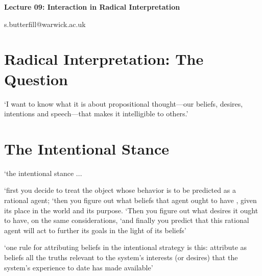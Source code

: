 \documentclass[12pt]{extarticle}
\date{}
\makeatletter
\def \ititle {Philosophical Psychology}
\def \iemail{s.butterfill@warwick.ac.uk}
\makeatother
\begin{document}
\begin{multicols*}{3}

\setlength\footnotesep{1em}









\def \ititle {Lecture 09: Interaction in Radical Interpretation}

\begin{center}

{\Large

\textbf{\ititle}

}



\iemail %

\end{center}



\section{Radical Interpretation: The Question}

‘I want to know what it is about propositional thought---our beliefs, desires, intentions and speech---that makes it intelligible to others.’

\citep[p.~14]{Davidson:1995nl}


\section{The Intentional Stance}

‘the intentional stance ...

‘first you decide to treat the object whose behavior is to be predicted as a rational agent; ‘then you figure out what beliefs that agent ought to have , given its place in the world and its purpose. ‘Then you figure out what desires it ought to have, on the same considerations,
‘and finally you predict that this rational agent will act to further its goals in the light of its beliefs’
\citep[p.~17]{Dennett:1987sf}

‘one rule for attributing beliefs in the intentional strategy is this: attribute as beliefs all the truths relevant to the system's interests (or desires) that the system's experience to date has made available’ \citep[p.~18]{Dennett:1987sf}


\end{multicols*}
\end{document}
